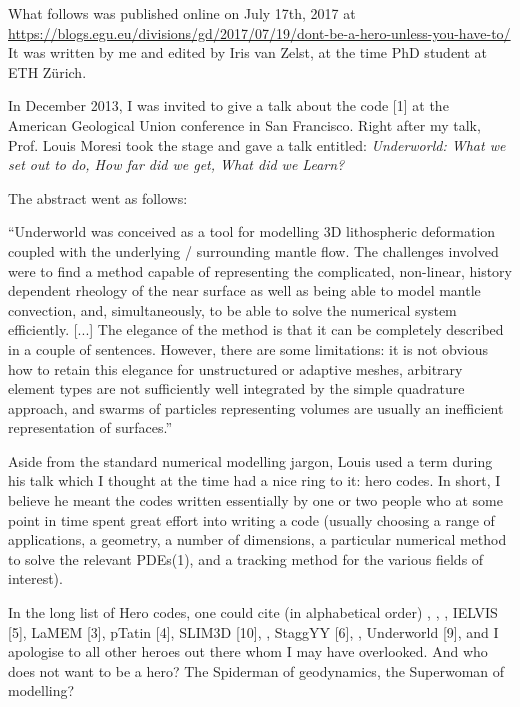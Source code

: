 What follows was published online on July 17th, 2017 at 
\url{https://blogs.egu.eu/divisions/gd/2017/07/19/dont-be-a-hero-unless-you-have-to/}
It was written by me and edited by Iris van Zelst, at the time PhD student at ETH Z\"urich.

\vspace{3mm}

In December 2013, I was invited to give a talk about the \aspect{} code [1] 
at the American Geological Union conference in San Francisco. Right 
after my talk, Prof. Louis Moresi took the stage and gave a talk entitled: 
{\it Underworld: What we set out to do, How far did we get, What did we Learn?}

The abstract went as follows:

``Underworld was conceived as a tool for modelling 3D lithospheric deformation coupled with the underlying / surrounding mantle flow. 
The challenges involved were to find a method capable of representing the complicated, non-linear, history dependent rheology of the near 
surface as well as being able to model mantle convection, and, simultaneously, to be able to solve the numerical system efficiently. [...] 
The elegance of the method is that it can be completely described in a couple of sentences. However, there are some limitations: 
it is not obvious how to retain this elegance for unstructured or adaptive meshes, arbitrary element types are not sufficiently well integrated 
by the simple quadrature approach, and swarms of particles representing volumes are usually an inefficient representation of surfaces.''

Aside from the standard numerical modelling jargon, Louis used a term during his talk which I thought at the time had a nice ring to it: hero codes. In short, I believe he meant the codes written essentially by one or two people who at some point in time spent great effort into writing a code (usually choosing a range of applications, a geometry, a number of dimensions, a particular numerical method to solve the relevant PDEs(1), and a tracking method for the various fields of interest).

In the long list of Hero codes, one could cite (in alphabetical order) \citcoms [1], \douar [8], \fantom [2], IELVIS [5], LaMEM [3], pTatin [4], SLIM3D [10], \sopale [7], StaggYY [6], \sulec [11], Underworld [9], and I apologise to all other heroes out there whom I may have overlooked. And who does not want to be a hero? The Spiderman of geodynamics, the Superwoman of modelling?

